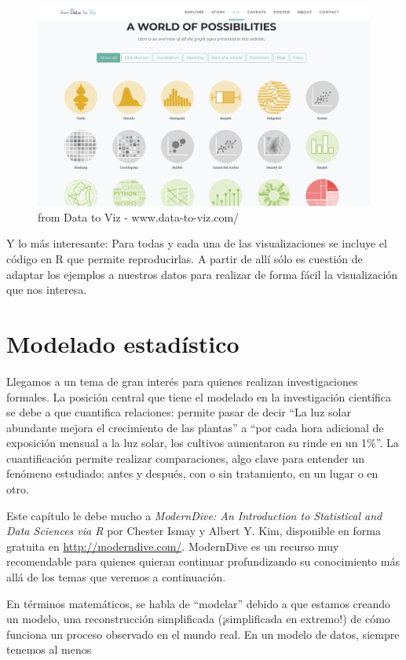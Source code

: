 \documentclass[]{book}
\begin{document}
\begin{figure}
\includegraphics[width=10.91in]{imagenes/data_to_viz} \caption{from Data to Viz - www.data-to-viz.com/}\label{fig:unnamed-chunk-111}
\end{figure}

Y lo más interesante: Para todas y cada una de las visualizaciones se
incluye el código en R que permite reproducirlas. A partir de allí sólo
es cuestión de adaptar los ejemplos a nuestros datos para realizar de
forma fácil la visualización que nos interesa.

\chapter{Modelado estadístico}\label{modelado-estadistico}

Llegamos a un tema de gran interés para quienes realizan investigaciones
formales. La posición central que tiene el modelado en la investigación
científica se debe a que cuantifica relaciones: permite pasar de decir
``La luz solar abundante mejora el crecimiento de las plantas'' a ``por
cada hora adicional de exposición mensual a la luz solar, los cultivos
aumentaron su rinde en un 1\%''. La cuantificación permite realizar
comparaciones, algo clave para entender un fenómeno estudiado: antes y
después, con o sin tratamiento, en un lugar o en otro.

Este capítulo le debe mucho a \emph{ModernDive: An Introduction to
Statistical and Data Sciences via R} por Chester Ismay y Albert Y. Kim,
disponible en forma gratuita en \url{http://moderndive.com/}. ModernDive
es un recurso muy recomendable para quienes quieran continuar
profundizando su conocimiento más allá de los temas que veremos a
continuación.

En términos matemáticos, se habla de ``modelar'' debido a que estamos
creando un modelo, una reconstrucción simplificada (¡simplificada en
extremo!) de cómo funciona un proceso observado en el mundo real. En un
modelo de datos, siempre tenemos al menos
\end{document}

